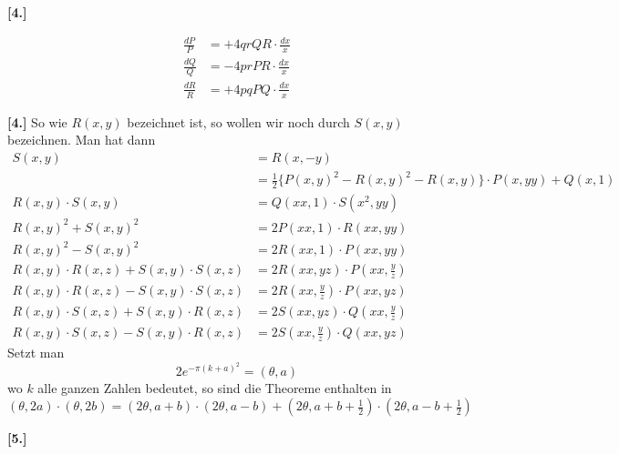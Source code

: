 \documentclass[10pt,a4paper]{article}
\begin{document}
\newpage
\textbf{[4.]}

\begin{align*}
\frac{dP}{P} &= +4qrQR \cdot \frac{dx}{x} \\
\frac{dQ}{Q} &= -4prPR \cdot \frac{dx}{x} \\
\frac{dR}{R} &= +4pqPQ \cdot \frac{dx}{x}
\end{align*}

\textbf{[4.]} So wie $R(x, y)$ bezeichnet ist, so wollen wir noch durch $S(x, y)$ bezeichnen. Man hat dann
%
\begin{align*}
S(x, y) &= R(x, -y) \\
&= \tfrac{1}{2}\{P(x, y)^2 - R(x, y)^2 - R(x, y)\} \cdot P(x, yy) + Q(x, 1) \\
R(x, y) \cdot S(x, y) &= Q(xx, 1) \cdot S(x^2, yy) \\
R(x, y)^2 + S(x, y)^2 &= 2P(xx, 1) \cdot R(xx, yy) \\
R(x, y)^2 - S(x, y)^2 &= 2R(xx, 1) \cdot P(xx, yy) \\
R(x, y) \cdot R(x, z) + S(x, y) \cdot S(x, z) &= 2R(xx, yz) \cdot P(xx, \tfrac{y}{z}) \\
R(x, y) \cdot R(x, z) - S(x, y) \cdot S(x, z) &= 2R(xx, \tfrac{y}{z}) \cdot P(xx, yz) \\
R(x, y) \cdot S(x, z) + S(x, y) \cdot R(x, z) &= 2S(xx, yz) \cdot Q(xx, \tfrac{y}{z}) \\
R(x, y) \cdot S(x, z) - S(x, y) \cdot R(x, z) &= 2S(xx, \tfrac{y}{z}) \cdot Q(xx, yz)
\end{align*}
%
Setzt man
%
\begin{equation*}
2e^{-\pi(k + a)^2} = (\theta, a)
\end{equation*}
%
wo $k$ alle ganzen Zahlen bedeutet, so sind die Theoreme enthalten in
%
\begin{equation*}
(\theta, 2a) \cdot (\theta, 2b) = (2\theta, a + b) \cdot (2\theta, a - b) + (2\theta, a + b + \tfrac{1}{2}) \cdot (2\theta, a - b + \tfrac{1}{2})
\end{equation*}

\newpage
\textbf{[5.]}
\end{document}
